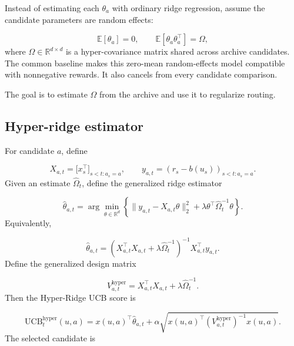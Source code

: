 \documentclass{article} %
\begin{document}
Instead of estimating each $\theta_a$ with ordinary ridge regression, assume
the candidate parameters are random effects:

\begin{equation}
\mathbb{E}[\theta_a]=0,\qquad
\mathbb{E}[\theta_a\theta_a^\top]=\Omega,
\end{equation}
where $\Omega \in \mathbb{R}^{d \times d}$ is a hyper-covariance matrix shared
across archive candidates. The common baseline makes this zero-mean random-effects model compatible with nonnegative rewards. It also cancels from every candidate comparison.

The goal is to estimate $\Omega$ from the archive and use it to regularize
routing.

\subsection{Hyper-ridge estimator}

For candidate $a$, define

\begin{equation}
X_{a,t} = \bigl[ x_s^\top \bigr]_{s < t : a_s = a}, \qquad
y_{a,t} = (r_s-b(u_s))_{s < t : a_s = a}.
\end{equation}
Given an estimate $\widehat{\Omega}_t$, define the generalized ridge estimator

\begin{equation}
\widehat{\theta}_{a,t}
= \arg\min_{\theta \in \mathbb{R}^d}
\left\{ \| y_{a,t} - X_{a,t}\theta \|_2^2
      + \lambda \theta^\top \widehat{\Omega}_t^{-1} \theta \right\}.
\end{equation}
Equivalently,

\begin{equation}
\widehat{\theta}_{a,t}
= \left( X_{a,t}^\top X_{a,t} + \lambda \widehat{\Omega}_t^{-1} \right)^{-1}
  X_{a,t}^\top y_{a,t}.
\end{equation}
Define the generalized design matrix

\begin{equation}
V_{a,t}^{\mathrm{hyper}} = X_{a,t}^\top X_{a,t} + \lambda \widehat{\Omega}_t^{-1}.
\end{equation}
Then the Hyper-Ridge UCB score is

\begin{equation}
\mathrm{UCB}_t^{\mathrm{hyper}}(u, a)
= x(u, a)^\top \widehat{\theta}_{a,t}
+ \alpha \sqrt{ x(u, a)^\top \left( V_{a,t}^{\mathrm{hyper}} \right)^{-1} x(u, a) }.
\end{equation}
The selected candidate is
\end{document}
